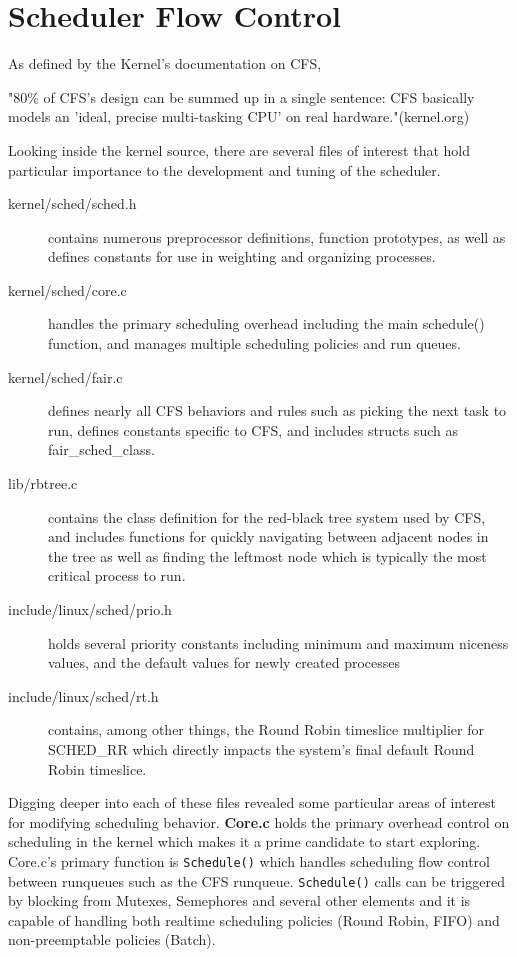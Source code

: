 \section{Scheduler Flow Control}

As defined by the Kernel's documentation on CFS,

"80\% of CFS's design can be summed up in a single sentence: CFS basically models an 'ideal, precise multi-tasking CPU' on real hardware."(kernel.org)
\vspace{1pc}

Looking inside the kernel source, there are several files of interest that hold particular importance to the development and tuning of the scheduler.

\begin{description}
	\item[kernel/sched/sched.h] contains numerous preprocessor definitions, function prototypes, as well as defines constants for use in weighting and organizing processes.
	\item[kernel/sched/core.c] handles the primary scheduling overhead including the main schedule() function, and manages multiple scheduling policies and run queues.
	\item[kernel/sched/fair.c] defines nearly all CFS behaviors and rules such as picking the next task to run, defines constants specific to CFS, and includes structs such as fair\_sched\_class.
	\item[lib/rbtree.c] contains the class definition for the red-black tree system used by CFS, and includes functions for quickly navigating between adjacent nodes in the tree as well as finding the leftmost node which is typically the most critical process to run.
	\item[include/linux/sched/prio.h] holds several priority constants including minimum and maximum niceness values, and the default values for newly created processes
	\item[include/linux/sched/rt.h] contains, among other things, the Round Robin timeslice multiplier for SCHED\_RR which directly impacts the system's final default Round Robin timeslice.
\end{description}

Digging deeper into each of these files revealed some particular areas of interest for modifying scheduling behavior. \textbf{Core.c} holds the primary overhead control on scheduling in the kernel which makes it a prime candidate to start exploring. Core.c's primary function is \texttt{Schedule()} which handles scheduling flow control between runqueues such as the CFS runqueue. \texttt{Schedule()} calls can be triggered by blocking from Mutexes, Semephores and several other elements and it is capable of handling both realtime scheduling policies (Round Robin, FIFO) and non-preemptable policies (Batch).

